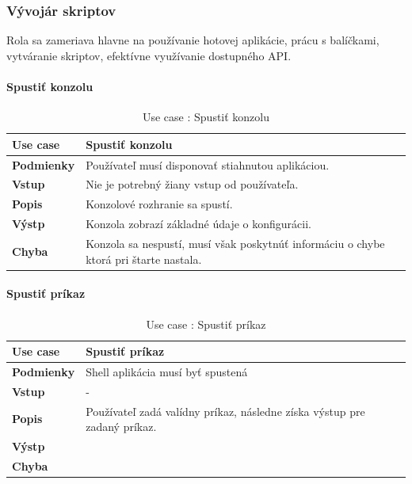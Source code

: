 \subsubsection{Vývojár skriptov}
\indent Rola sa zameriava hlavne na používanie hotovej aplikácie, prácu s balíčkami, vytváranie skriptov, efektívne využívanie dostupného API. 
\paragraph{Spustiť konzolu}
\begin{center}
	\begin{table}[htbp]
		\begin{tabular}{|p{2.5cm}|p{14cm}|}
			\hline
			\textbf{Use case} & Spustiť konzolu \\ 
			\hline
			\textbf{Podmienky} & Používateľ musí disponovať stiahnutou aplikáciou.\\
			\hline
			\textbf{Vstup} & Nie je potrebný žiany vstup od používateľa.\\
			\hline
			\textbf{Popis} & Konzolové rozhranie sa spustí. \\ 
			\hline
			\textbf{Výstp} & Konzola zobrazí základné údaje o konfigurácii.\\
			\hline
			\textbf{Chyba} & Konzola sa nespustí, musí však poskytnúť informáciu o chybe ktorá pri štarte nastala.\\
			\hline
		\end{tabular}
	\caption{Use case : Spustiť konzolu}
	\label{table:1}
	\end{table}
\end{center}
\paragraph{Spustiť príkaz}
\begin{center}
	\begin{table}[htbp]
		\begin{tabular}{|p{2.5cm}|p{14cm}|}
		\hline
		\textbf{Use case} & Spustiť príkaz \\ 
		\hline
		\textbf{Podmienky} & Shell aplikácia musí byť spustená \\ 
		\hline
		\textbf{Vstup} & -\\
		\hline
		\textbf{Popis} & Používateľ zadá valídny príkaz, následne získa výstup pre zadaný príkaz. \\ 
		\hline
		\textbf{Výstp} & \\
		\hline
		\textbf{Chyba} & \\
		\hline
		\end{tabular}
	\caption{Use case : Spustiť príkaz}
	\label{table:1}
	\end{table}
\end{center}
